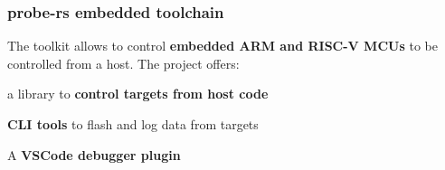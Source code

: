 \begin{timeline}
    \subsubsection{probe-rs embedded toolchain}
    The toolkit allows to control \textbf{embedded ARM and RISC-V MCUs} to be controlled from a host.
    The project offers:
    \begin{tightemize}
    \item a library to \textbf{control targets from host code}
    \item \textbf{CLI tools} to flash and log data from targets
    \item A \textbf{VSCode debugger plugin}
    \end{tightemize}
    \sectionsep
    
    


\end{timeline}
